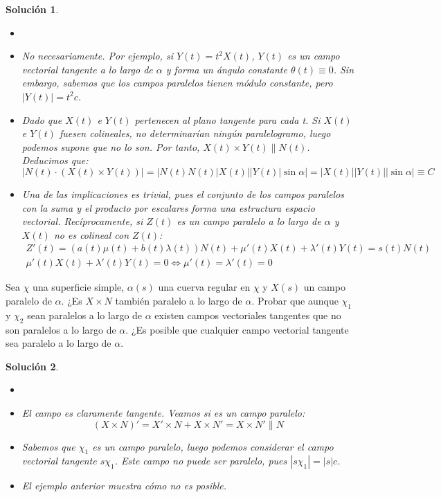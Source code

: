 \documentclass{article}
\theoremstyle{plain}
\newtheorem*{sol*}{Solución}
\newcommand{\X}{\chi}
\newenvironment{ejercicio}[2][Estado]{\begin{trivlist}
\item[\hskip \labelsep {\bfseries Ejercicio}\hskip \labelsep {\bfseries #2.}]}{\end{trivlist}}
\begin{document}
\begin{sol*}
\begin{itemize}
\item[]
\item No necesariamente. Por ejemplo, si $Y(t)=t^2 X(t)$, $Y(t)$ es un campo vectorial tangente a lo largo de $\alpha$ y forma un ángulo constante $\theta(t)\equiv 0$. Sin embargo, sabemos que los campos paralelos tienen módulo constante, pero $|Y(t)| = t^2 c$.
\item Dado que $X(t)$ e $Y(t)$ pertenecen al plano tangente para cada t. Si $X(t)$ e $Y(t)$ fuesen colineales, no determinarían ningún paralelogramo, luego podemos supone que no lo son. Por tanto, $X(t)\times Y(t) \parallel N(t)$. Deducimos que:
\[
|N(t)\cdot (X(t)\times Y(t))| = |N(t)N(t)|X(t)||Y(t)|\sin \alpha| = |X(t)||Y(t)||\sin{\alpha}|\equiv C
\]
\item Una de las implicaciones es trivial, pues el conjunto de los campos paralelos con la suma y el producto por escalares forma una estructura espacio vectorial. Recíprocamente, si $Z(t)$ es un campo paralelo a lo largo de $\alpha$ y $X(t)$ no es colineal con $Z(t)$:
\begin{gather*}
Z'(t) = (a(t)\mu(t)+b(t)\lambda(t))N(t) + \mu'(t)X(t)+\lambda'(t)Y(t) = s(t)N(t)\\
 \mu'(t)X(t)+\lambda'(t)Y(t) = 0 \Leftrightarrow \mu'(t)=\lambda'(t)=0
\end{gather*}
\end{itemize}
\end{sol*}
\newpage
\begin{ejercicio}{9}
Sea $\X$ una superficie simple, $\alpha(s)$ una cuerva regular en $\X$ y $X(s)$ un campo paralelo de $\alpha$. ¿Es $X\times N$ también paralelo a lo largo de $\alpha$. Probar que aunque $\X_1$ y $\X_2$ sean paralelos a lo largo de $\alpha$ existen campos vectoriales tangentes que no son paralelos a lo largo de $\alpha$. ¿Es posible que cualquier campo vectorial tangente sea paralelo a lo largo de $\alpha$.
\end{ejercicio}
\begin{sol*}
\begin{itemize}
\item[]
\item El campo es claramente tangente. Veamos si es un campo paralelo:
\[
(X\times N)' = X'\times N + X \times N' = X \times N' \parallel N
\]
\item Sabemos que $\X_1$ es un campo paralelo, luego podemos considerar el campo vectorial tangente $s\X_1$. Este campo no puede ser paralelo, pues $|s\X_1|=|s|c$.
\item El ejemplo anterior muestra cómo no es posible.
\end{itemize}
\end{sol*}
\end{document}
